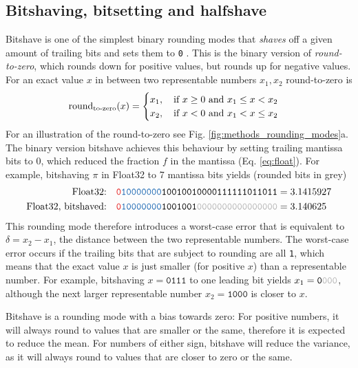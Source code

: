 \subsection{Bitshaving, bitsetting and halfshave}
\label{sec:bitshave}

Bitshave is one of the simplest binary rounding modes that \emph{shaves} off a given amount of trailing bits and sets them to \texttt{0}
\citep{Zender2016,Kouznetsov2020}. This is the binary version of \emph{round-to-zero}, which rounds down for positive values, but
rounds up for negative values. For an exact value $x$ in between two representable numbers $x_1,x_2$ round-to-zero is
\begin{equation}
	\operatorname{round}_{\operatorname{to-zero}}(x) = \begin{cases} x_1, \quad \text{if } x \geq 0 \text{ and } x_1 \leq x < x_2 \\
									x_2, \quad \text{if } x < 0 \text{ and } x_1 < x \leq x_2 \end{cases}
	\label{eq:round_zero}
\end{equation}
For an illustration of the round-to-zero see Fig. \ref{fig:methods_rounding_modes}a. The binary version bitshave achieves this behaviour
by setting trailing mantissa bits to 0, which reduced the fraction $f$ in the mantissa
(Eq. \ref{eq:float}). For example, bitshaving $\pi$ in Float32 to 7 mantissa bits yields (rounded bits in grey)
\begin{align}
	\text{Float32:}& \quad \mathtt{{\color{psign}0}{\color{pexpo}10000000}10010010000111111011011} = 3.1415927 \nonumber \\
	\text{Float32, bitshaved:}& \quad \mathtt{{\color{psign}0}{\color{pexpo}10000000}1001001{\color{gray}0000000000000000}} = 3.140625
	\label{eq:bitshave}
\end{align}
This rounding mode therefore introduces a worst-case error that is equivalent to $\delta = x_2-x_1$, the distance between the two
representable numbers. The worst-case error occurs if the trailing bits that are subject to rounding are all \texttt{1}, which means
that the exact value $x$ is just smaller (for positive $x$) than a representable number. For example, bitshaving $x = \mathtt{0111}$
to one leading bit yields $x_1 = \mathtt{0{\color{gray}000}}$, although the next larger representable number $x_2 = \mathtt{1000}$
is closer to $x$.

Bitshave is a rounding mode with a bias towards zero: For positive numbers, it will always round to values that are smaller or the
same, therefore it is expected to reduce the mean. For numbers of either sign, bitshave will reduce the variance, as it will always
round to values that are closer to zero or the same.


